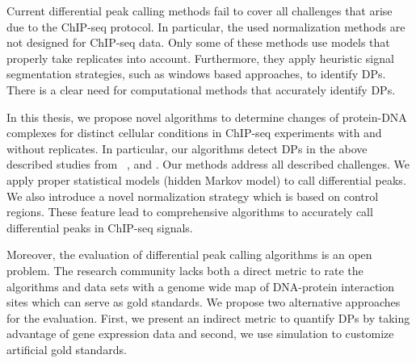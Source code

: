 Current differential peak calling methods fail to cover all challenges that arise due to the ChIP-seq protocol.
In particular, the used normalization methods are not designed for ChIP-seq data.
Only some of these methods use models that properly take replicates into account.
Furthermore, they apply heuristic signal segmentation strategies, such as windows based approaches, to identify DPs.
There is a clear need for computational methods that accurately identify DPs.

In this thesis, we propose novel algorithms to determine changes of protein-DNA complexes for distinct cellular conditions in ChIP-seq experiments with and without replicates.
In particular, our algorithms detect DPs in the above described studies from ~\cite{Lin2015}, \cite{Koues2015} and \cite{Stunnenberg2014}.
Our methods address all described challenges.
We apply proper statistical models (hidden Markov model) to call differential peaks.
We also introduce a novel normalization strategy which is based on control regions.
These feature lead to comprehensive algorithms to accurately call differential peaks in ChIP-seq signals.

Moreover, the evaluation of differential peak calling algorithms is an open problem.
The research community lacks both a direct metric to rate the algorithms and data sets with a genome wide map of DNA-protein interaction sites which can serve as gold standards.
We propose two alternative approaches for the evaluation.
First, we present an indirect metric to quantify DPs by taking advantage of gene expression data and second, we use simulation to customize artificial gold standards.




